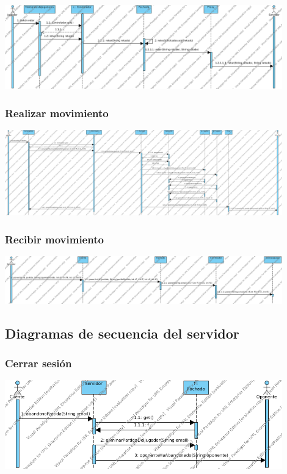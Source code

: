 \documentclass[a4paper,11pt,oneside]{article}
\begin{document}
\includegraphics[width=0.9\textwidth]{img/ds_EnviarRetoCliente.png}\\[1cm]

\subsubsection{Realizar movimiento}

\includegraphics[width=0.9\textwidth]{img/ds_RealizarMovimientoCliente.png}\\[1cm]

\subsubsection{Recibir movimiento}

\includegraphics[width=0.9\textwidth]{img/ds_RecibirMovimientoCliente.png}\\[1cm]


\subsection{Diagramas de secuencia del servidor}

\subsubsection{Cerrar sesión}

\includegraphics[width=0.9\textwidth]{img/ds_CerrarSesionServidor.png}\\[1cm]
\end{document}
